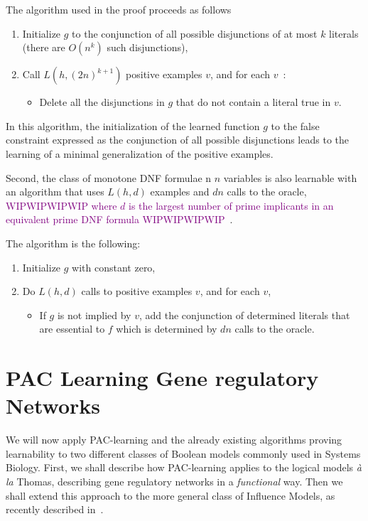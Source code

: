 \documentclass{llncs}
\newcommand{\wip}[1]{\textcolor{Purple}{WIPWIPWIPWIP #1 WIPWIPWIPWIP}}
\begin{document}
The algorithm used in the proof proceeds as follows
\begin{enumerate}
  \item Initialize $g$ to the conjunction of all possible disjunctions of at most $k$ literals (there are $O(n^k)$ such disjunctions),
\item Call $L(h,(2n)^{k+1})$ positive examples $v$, and for each $v$~:
\begin{itemize}
\item Delete all the disjunctions in $g$ that do not contain a literal true in $v$.	
\end{itemize}

\end{enumerate}

In this algorithm, the initialization of the learned function $g$ to the false constraint expressed as the conjunction of all possible disjunctions
leads to the learning of a minimal  generalization of the positive examples.


\begin{theorem}\label{thm:mdnf}
    Second, the class of monotone DNF formulae n $n$ variables is also learnable with an
    algorithm that uses $L(h,d)$ examples and $d n$ calls to the oracle,
    \wip{where $d$ is the largest number of prime implicants in an equivalent prime DNF formula}~\cite{Valiant84cacm}.
\end{theorem}

The algorithm is the following:
\begin{enumerate}
\item Initialize $g$ with constant zero,
\item
Do $L(h,d)$ calls to positive examples $v$, and for each $v$,
\begin{itemize}
	\item 
	If $g$ is not implied by $v$, add the conjunction of determined literals that
	are essential to $f$ which is determined by $d n$ calls to the oracle.
\end{itemize}
\end{enumerate}

\section{PAC Learning Gene regulatory Networks}

We will now apply PAC-learning and the already existing algorithms proving
learnability to two different classes of Boolean models commonly used in
Systems Biology. First, we shall describe how PAC-learning applies to the
logical models \emph{\`a la} Thomas, describing gene regulatory networks in a
\emph{functional} way. Then we shall extend this approach to the more general
class of Influence Models, as recently described in~\cite{FMRS16cmsb}.
\end{document}
